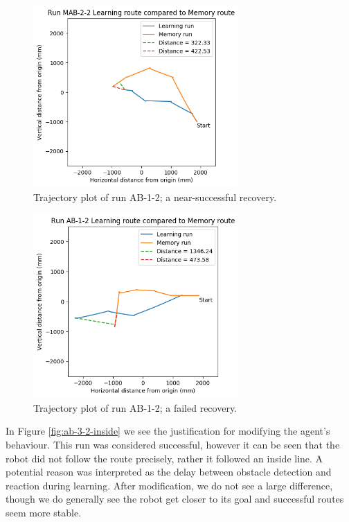 \documentclass[a4paper,11pt,twoside,openright]{article}
\begin{document}
\begin{figure}
 \centering
  \includegraphics[width=0.7\textwidth]{MAB-2-2}
  \caption{
    \label{fig:mab-2-2-succ} Trajectory plot of run AB-1-2; a near-successful recovery.
  }
\end{figure}


\begin{figure}
 \centering
  \includegraphics[width=0.7\textwidth]{AB-1-2}
  \caption{
    \label{fig:ab-1-2-fail} Trajectory plot of run AB-1-2; a failed recovery.
  }
\end{figure}

In Figure \ref{fig:ab-3-2-inside} we see the justification for modifying the agent's behaviour. This run was considered successful, however it can be seen
that the robot did not follow the route precisely, rather it followed an inside line. A potential reason was interpreted as the
delay between obstacle detection and reaction during learning. After modification, we do not see a large difference, though
we do generally see the robot get closer to its goal and successful routes seem more stable.
\newline
\end{document}
